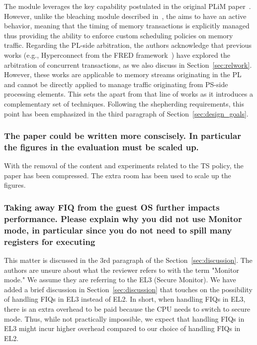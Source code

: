         The \schim module leverages the key capability postulated in
        the original PLiM paper~\cite{PLIM20}. However, unlike the
        bleaching module described in~\cite{PLIM20}, the \schim aims
        to have an active behavior, meaning that the timing of memory
        transactions is explicitly managed thus providing the ability
        to enforce custom scheduling policies on memory traffic.
        Regarding the PL-side arbitration, the authors acknowledge
        that previous works (e.g., Hyperconnect from the FRED
        framework~\cite{fred_hyperconnect}) have explored the arbitration of concurrent
        transactions, as we also discuss in
        Section~\ref{sec:relwork}. However, these works are applicable
        to memory streams originating in the PL and cannot be directly
        applied to manage traffic originating from PS-side processing
        elements. This sets the \schim apart from that line of works
        as it introduces a complementary set of techniques. Following
        the shepherding requirements, this point has been emphasized
        in the third paragraph of Section~\ref{sec:design_goals}.



        \subsubsection{The paper could be written more conscisely. In
        particular the figures in the evaluation must be scaled up.}

        With the removal of the content and experiments related to the
        TS policy, the paper has been compressed. The extra room has
        been used to scale up the figures.

        \subsubsection{Taking away FIQ from the guest OS further
        impacts performance. Please explain why you did not use
        Monitor mode, in particular since you do not need to spill
        many registers for executing}

        This matter is discussed in the 3rd paragraph of the
        Section~\ref{sec:discussion}. The authors are unsure about
        what the reviewer refers to with the term "Monitor mode." We
        assume they are referring to the EL3 (Secure Monitor). We have
        added a brief discussion in Section~\ref{sec:discussion} that
        touches on the possibility of handling FIQs in EL3 instead of
        EL2. In short, when handling FIQs in EL3, there is an extra
        overhead to be paid because the CPU needs to switch to secure
        mode. Thus, while not practically impossible, we expect that
        handling FIQs in EL3 might incur higher overhead compared to
        our choice of handling FIQs in EL2.

